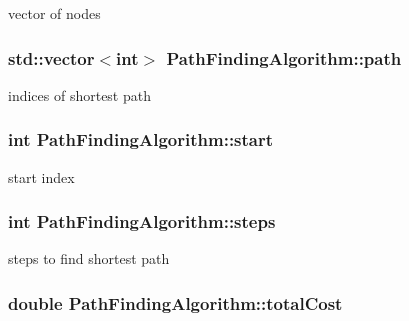 vector of nodes 

\hypertarget{classPathFindingAlgorithm_ab177b2276cdf28fb77361bff19745b17}{
\subsubsection[{path}]{\setlength{\rightskip}{0pt plus 5cm}std\-::vector$<$int$>$ Path\-Finding\-Algorithm\-::path\hspace{0.3cm}{\ttfamily [protected]}}}\label{classPathFindingAlgorithm_ab177b2276cdf28fb77361bff19745b17}


indices of shortest path 

\hypertarget{classPathFindingAlgorithm_a1c31bd6b8c57459c32ada19cf9bf412a}{
\subsubsection[{start}]{\setlength{\rightskip}{0pt plus 5cm}int Path\-Finding\-Algorithm\-::start\hspace{0.3cm}{\ttfamily [protected]}}}\label{classPathFindingAlgorithm_a1c31bd6b8c57459c32ada19cf9bf412a}


start index 

\hypertarget{classPathFindingAlgorithm_aa4d442ba7d2499f61e81b8c0fabc55a5}{
\subsubsection[{steps}]{\setlength{\rightskip}{0pt plus 5cm}int Path\-Finding\-Algorithm\-::steps\hspace{0.3cm}{\ttfamily [protected]}}}\label{classPathFindingAlgorithm_aa4d442ba7d2499f61e81b8c0fabc55a5}


steps to find shortest path 

\hypertarget{classPathFindingAlgorithm_ad6a91f82618d6a7a95900b5c63337837}{
\subsubsection[{total\-Cost}]{\setlength{\rightskip}{0pt plus 5cm}double Path\-Finding\-Algorithm\-::total\-Cost\hspace{0.3cm}{\ttfamily [protected]}}}\label{classPathFindingAlgorithm_ad6a91f82618d6a7a95900b5c63337837}


